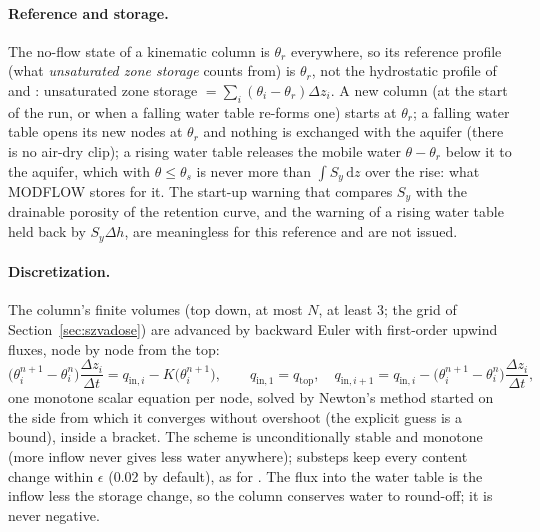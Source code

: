 \paragraph{Reference and storage.} The no-flow state of a kinematic column is $\theta_r$ everywhere, so its reference
profile (what \emph{unsaturated zone storage} counts from) is $\theta_r$, not the hydrostatic profile of
 and : unsaturated zone storage $=\sum_i(\theta_i-\theta_r)\Delta z_i$. A new column (at the
start of the run, or when a falling water table re-forms one) starts at $\theta_r$; a falling water table opens its new
nodes at $\theta_r$ and nothing is exchanged with the aquifer (there is no air-dry clip); a rising water table releases
the mobile water $\theta-\theta_r$ below it to the aquifer, which with $\theta\le\theta_s$ is never more than
$\int S_y\,\mathrm{d}z$ over the rise: what MODFLOW stores for it. The start-up warning that compares $S_y$ with the
drainable porosity of the retention curve, and the warning of a rising water table held back by $S_y\Delta h$, are
meaningless for this reference and are not issued.

\paragraph{Discretization.} The column's finite volumes (top down, at most $N$, at least 3; the grid of
Section~\ref{sec:szvadose}) are advanced by backward Euler with first-order upwind fluxes, node by node from the top:
\begin{equation}
\big(\theta_i^{n+1}-\theta_i^{n}\big)\frac{\Delta z_i}{\Delta t}=q_{\mathrm{in},i}-K\big(\theta_i^{n+1}\big),\qquad
q_{\mathrm{in},1}=q_{\mathrm{top}},\quad q_{\mathrm{in},i+1}=q_{\mathrm{in},i}-\big(\theta_i^{n+1}-\theta_i^{n}\big)\frac{\Delta z_i}{\Delta t},
\end{equation}
one monotone scalar equation per node, solved by Newton's method started on the side from which it converges without
overshoot (the explicit guess is a bound), inside a bracket. The scheme is unconditionally stable and monotone (more
inflow never gives less water anywhere); substeps keep every content change within $\epsilon$ (0.02 by default), as for
. The flux into the water table is the inflow less the storage change, so the column conserves water to
round-off; it is never negative.

